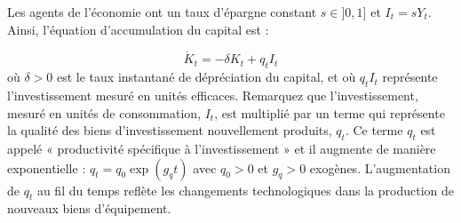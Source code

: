 \documentclass{article}
\begin{document}
Les agents de l’économie ont un taux d’épargne constant \( s \in]0,1] \) et $I_t = s Y_t $.  Ainsi, l’équation d’accumulation du capital est :

\begin{equation}\label{eq1}
    \dot{K}_t = -\delta K_t + q_t I_t 
\end{equation}
où \( \delta > 0 \) est le taux instantané de dépréciation du capital, et où $q_t I_t$ représente l'investissement mesuré en unités efficaces. Remarquez que l'investissement, mesuré en unités de consommation, $I_t$, est multiplié par un terme qui représente la qualité des biens d'investissement nouvellement produits, $q_t$. Ce terme $q_t$ est appelé « productivité spécifique à l’investissement » et il augmente de manière exponentielle : $q_t = q_0 \exp(g_q t)$ avec $q_0 > 0$ et $g_q > 0$ exogènes. L'augmentation de $q_t$ au fil du temps reflète les changements technologiques dans la production de nouveaux biens d'équipement.



\end{document}
